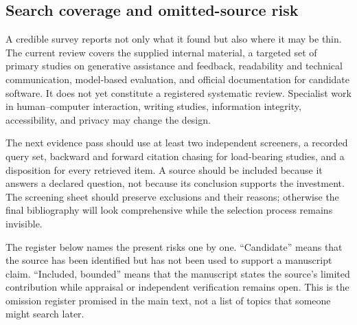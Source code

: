 \subsection{Search coverage and omitted-source risk}

A credible survey reports not only what it found but also where it may be
thin. The current review covers the supplied internal material, a targeted
set of primary studies on generative assistance and feedback, readability and
technical communication, model-based evaluation, and official documentation
for candidate software. It does not yet constitute a registered systematic
review. Specialist work in human--computer interaction, writing studies,
information integrity, accessibility, and privacy may change the design.

The next evidence pass should use at least two independent screeners, a
recorded query set, backward and forward citation chasing for load-bearing
studies, and a disposition for every retrieved item. A source should be
included because it answers a declared question, not because its conclusion
supports the investment. The screening sheet should preserve exclusions and
their reasons; otherwise the final bibliography will look comprehensive while
the selection process remains invisible.

The register below names the present risks one by one. ``Candidate'' means that
the source has been identified but has not been used to support a manuscript
claim. ``Included, bounded'' means that the manuscript states the source's
limited contribution while appraisal or independent verification remains
open. This is the omission register promised in the main text, not a list of
topics that someone might search later.


